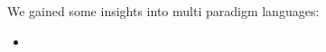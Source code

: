 \documentclass[thesis-solanki.tex]{subfiles}
\begin{document}
We gained some insights into multi paradigm languages:
\begin{itemize}
	\item
\end{itemize}

\ifMain
\begin{scope}
  \nolinenumbers
  \enotesize
  \par
  \begin{singlespace}
  \setlength{\parskip}{12pt plus 2pt minus 1pt}
  \theendnotes
  \par
  \end{singlespace}
\end{scope}
\fi
\end{document}
